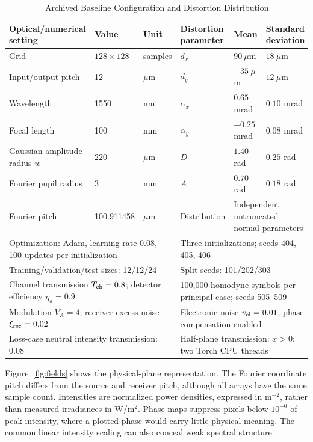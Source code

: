 \documentclass[journal]{IEEEtran}
\begin{document}
\begin{table}[!t]
\caption{Archived Baseline Configuration and Distortion Distribution}
\label{tab:config}
\centering\small
\setlength{\tabcolsep}{4pt}
\begin{tabular}{lll@{\qquad}lll}
\toprule
Optical/numerical setting & Value & Unit & Distortion parameter & Mean & Standard deviation\\
\midrule
Grid & $128\times128$ & samples & $d_x$ & $90~\mu$m & $18~\mu$m\\
Input/output pitch & 12 & $\mu$m & $d_y$ & $-35~\mu$m & $12~\mu$m\\
Wavelength & 1550 & nm & $\alpha_x$ & $0.65$ mrad & $0.10$ mrad\\
Focal length & 100 & mm & $\alpha_y$ & $-0.25$ mrad & $0.08$ mrad\\
Gaussian amplitude radius $w$ & 220 & $\mu$m & $D$ & $1.40$ rad & $0.25$ rad\\
Fourier pupil radius & 3 & mm & $A$ & $0.70$ rad & $0.18$ rad\\
Fourier pitch & 100.911458 & $\mu$m & Distribution & \multicolumn{2}{l}{Independent untruncated normal parameters}\\
\midrule
\multicolumn{3}{l}{Optimization: Adam, learning rate 0.08, 100 updates per initialization} & \multicolumn{3}{l}{Three initializations; seeds 404, 405, 406}\\
\multicolumn{3}{l}{Training/validation/test sizes: 12/12/24} & \multicolumn{3}{l}{Split seeds: 101/202/303}\\
\multicolumn{3}{l}{Channel transmission $T_{\rm ch}=0.8$; detector efficiency $\eta_d=0.9$} & \multicolumn{3}{l}{100,000 homodyne symbols per principal case; seeds 505--509}\\
\multicolumn{3}{l}{Modulation $V_A=4$; receiver excess noise $\xi_{\rm rec}=0.02$} & \multicolumn{3}{l}{Electronic noise $v_{\rm el}=0.01$; phase compensation enabled}\\
\multicolumn{3}{l}{Loss-case neutral intensity transmission: 0.08} & \multicolumn{3}{l}{Half-plane transmission: $x>0$; two Torch CPU threads}\\
\bottomrule
\end{tabular}
\end{table}

Figure~\ref{fig:fields} shows the physical-plane representation. The Fourier coordinate pitch differs from the source and receiver pitch, although all arrays have the same sample count. Intensities are normalized power densities, expressed in m$^{-2}$, rather than measured irradiances in W/m$^2$. Phase maps suppress pixels below $10^{-6}$ of peak intensity, where a plotted phase would carry little physical meaning. The common linear intensity scaling can also conceal weak spectral structure.
\end{document}
